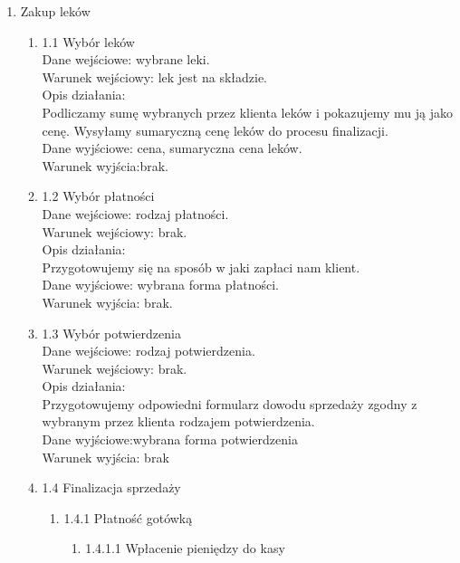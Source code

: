\documentclass[a4paper, 11pt]{article}
\begin{document}
	\begin{enumerate}	
	\item  Zakup leków
	\begin{enumerate}
	\item 1.1 Wybór leków\\
	Dane wejściowe: wybrane leki.\\	
	Warunek wejściowy: lek jest na składzie.\\	
	Opis działania:\\
		Podliczamy sumę wybranych przez klienta leków i pokazujemy mu ją jako cenę. Wysyłamy sumaryczną cenę leków do procesu finalizacji.\\
		
	Dane wyjściowe: cena, sumaryczna cena leków.\\	
	Warunek wyjścia:brak.\\	
	
	\item 1.2 Wybór płatności\\
	Dane wejściowe: rodzaj płatności.\\
	Warunek wejściowy: brak.\\
	Opis działania:\\
		Przygotowujemy się na sposób w jaki zapłaci nam klient.\\
		
	Dane wyjściowe: wybrana forma płatności.\\
	Warunek wyjścia: brak.\\	
	\item 1.3 Wybór potwierdzenia\\
	Dane wejściowe: rodzaj potwierdzenia.\\
	Warunek wejściowy: brak.\\
	Opis działania:\\
		Przygotowujemy odpowiedni formularz dowodu sprzedaży zgodny z wybranym przez klienta rodzajem potwierdzenia.\\
		
	Dane wyjściowe:wybrana forma potwierdzenia \\
	Warunek wyjścia: brak\\	
	\item 1.4 Finalizacja sprzedaży
	\begin{enumerate}
	\item  1.4.1 Płatność gotówką
		\begin{enumerate}
			\item 1.4.1.1 Wpłacenie pieniędzy do kasy\\


\end{enumerate}
\end{enumerate}
\end{enumerate}
\end{enumerate}
\end{document}
